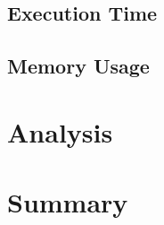 	\subsection{Execution Time} \label{sec:results/overhead/time}
	
	\subsection{Memory Usage} \label{sec:results/overhead/memory}

\section{Analysis} \label{sec:results/analysis}

\section{Summary} \label{sec:results/summary}